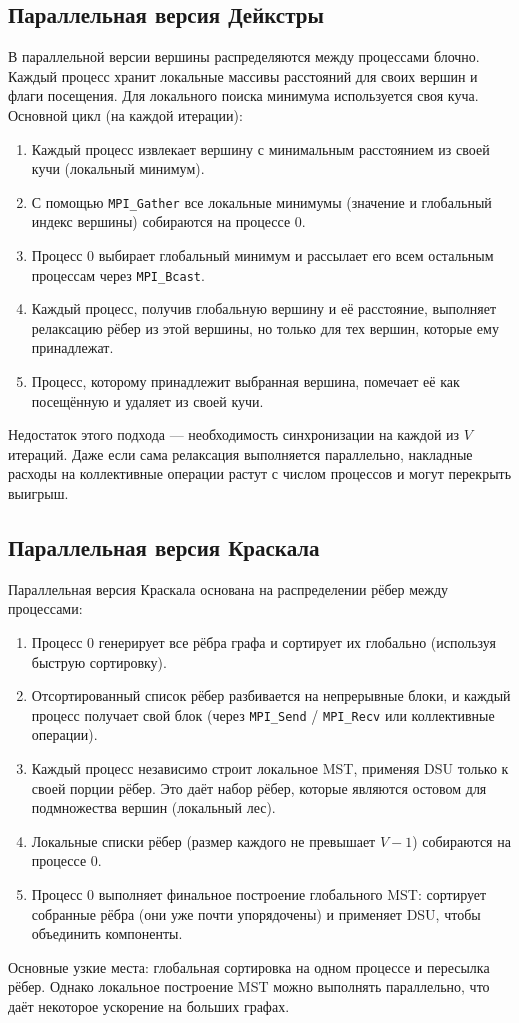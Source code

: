 \documentclass[14pt,a4paper]{article}
\begin{document}
\subsection{Параллельная версия Дейкстры}
В параллельной версии вершины распределяются между процессами блочно. Каждый процесс хранит локальные массивы расстояний для своих вершин и флаги посещения. Для локального поиска минимума используется своя куча. Основной цикл (на каждой итерации):
\begin{enumerate}
    \item Каждый процесс извлекает вершину с минимальным расстоянием из своей кучи (локальный минимум).
    \item С помощью \texttt{MPI\_Gather} все локальные минимумы (значение и глобальный индекс вершины) собираются на процессе 0.
    \item Процесс 0 выбирает глобальный минимум и рассылает его всем остальным процессам через \texttt{MPI\_Bcast}.
    \item Каждый процесс, получив глобальную вершину и её расстояние, выполняет релаксацию рёбер из этой вершины, но только для тех вершин, которые ему принадлежат.
    \item Процесс, которому принадлежит выбранная вершина, помечает её как посещённую и удаляет из своей кучи.
\end{enumerate}
Недостаток этого подхода — необходимость синхронизации на каждой из $V$ итераций. Даже если сама релаксация выполняется параллельно, накладные расходы на коллективные операции растут с числом процессов и могут перекрыть выигрыш.

\subsection{Параллельная версия Краскала}
Параллельная версия Краскала основана на распределении рёбер между процессами:
\begin{enumerate}
    \item Процесс 0 генерирует все рёбра графа и сортирует их глобально (используя быструю сортировку).
    \item Отсортированный список рёбер разбивается на непрерывные блоки, и каждый процесс получает свой блок (через \texttt{MPI\_Send} / \texttt{MPI\_Recv} или коллективные операции).
    \item Каждый процесс независимо строит локальное MST, применяя DSU только к своей порции рёбер. Это даёт набор рёбер, которые являются остовом для подмножества вершин (локальный лес).
    \item Локальные списки рёбер (размер каждого не превышает $V-1$) собираются на процессе 0.
    \item Процесс 0 выполняет финальное построение глобального MST: сортирует собранные рёбра (они уже почти упорядочены) и применяет DSU, чтобы объединить компоненты.
\end{enumerate}
Основные узкие места: глобальная сортировка на одном процессе и пересылка рёбер. Однако локальное построение MST можно выполнять параллельно, что даёт некоторое ускорение на больших графах.
\end{document}
